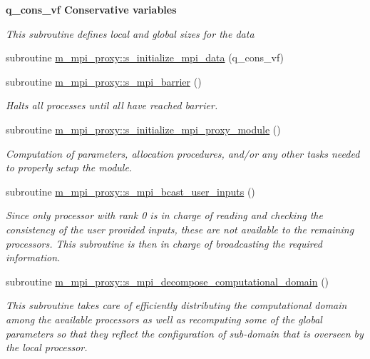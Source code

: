 \begin{Indent}\textbf{ q\+\_\+cons\+\_\+vf Conservative variables}\par
{\em This subroutine defines local and global sizes for the data }\begin{DoxyCompactItemize}
\item 
subroutine \hyperlink{namespacem__mpi__proxy_a2ff35ede51e90c483969e44c31303415}{m\+\_\+mpi\+\_\+proxy\+::s\+\_\+initialize\+\_\+mpi\+\_\+data} (q\+\_\+cons\+\_\+vf)
\item 
subroutine \hyperlink{namespacem__mpi__proxy_abfbc42cea69273bc9fa4a2d78f636eb1}{m\+\_\+mpi\+\_\+proxy\+::s\+\_\+mpi\+\_\+barrier} ()
\begin{DoxyCompactList}\small\item\em Halts all processes until all have reached barrier. \end{DoxyCompactList}\item 
subroutine \hyperlink{namespacem__mpi__proxy_a015ee2c0892e9cfcb858da8f27b646d5}{m\+\_\+mpi\+\_\+proxy\+::s\+\_\+initialize\+\_\+mpi\+\_\+proxy\+\_\+module} ()
\begin{DoxyCompactList}\small\item\em Computation of parameters, allocation procedures, and/or any other tasks needed to properly setup the module. \end{DoxyCompactList}\item 
subroutine \hyperlink{namespacem__mpi__proxy_a69660c5fe9302a8c0496b622fa3b5286}{m\+\_\+mpi\+\_\+proxy\+::s\+\_\+mpi\+\_\+bcast\+\_\+user\+\_\+inputs} ()
\begin{DoxyCompactList}\small\item\em Since only processor with rank 0 is in charge of reading and checking the consistency of the user provided inputs, these are not available to the remaining processors. This subroutine is then in charge of broadcasting the required information. \end{DoxyCompactList}\item 
subroutine \hyperlink{namespacem__mpi__proxy_a80c5e235786545276fe6ffa06965017f}{m\+\_\+mpi\+\_\+proxy\+::s\+\_\+mpi\+\_\+decompose\+\_\+computational\+\_\+domain} ()
\begin{DoxyCompactList}\small\item\em This subroutine takes care of efficiently distributing the computational domain among the available processors as well as recomputing some of the global parameters so that they reflect the configuration of sub-\/domain that is overseen by the local processor. \end{DoxyCompactList}\item 

\end{DoxyCompactItemize}
\end{Indent}
